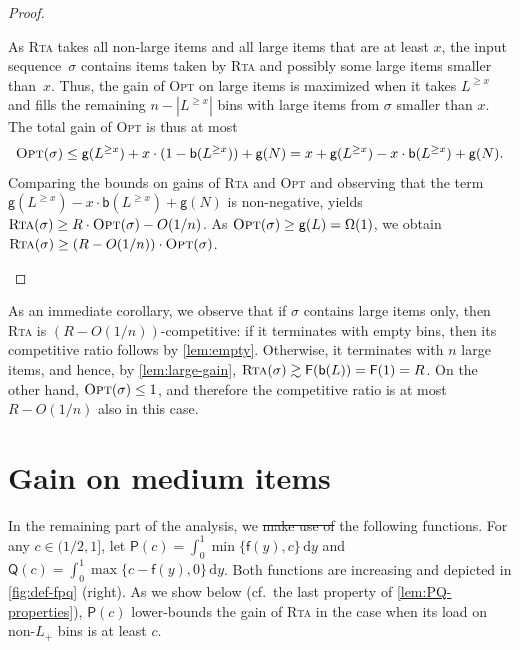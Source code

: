 \documentclass[a4paper,USenglish,cleveref]{lipics-v2019}
\newcommand{\R}{\ensuremath{R}}
\newcommand{\LG}{\ensuremath{L}\xspace}
\newcommand{\LT}{\ensuremath{L_+}\xspace}
\newcommand{\f}{\textsf{f}}
\newcommand{\fintegral}{\textsf{F}}
\newcommand{\water}{\textsf{Q}}
\newcommand{\cutintegral}{\textsf{P}}
\newcommand{\B}{\textsf{b}}
\newcommand{\gain}{\textsf{g}}
\newcommand{\dd}{\mathrm{d}}
\newcommand{\ALG}{\textsc{Rta}\xspace}
\newcommand{\OPT}{\textsc{Opt}\xspace}
\newcommand\maciek[1]{\texthl{#1}}
\begin{document}
\begin{proof}
\begin{itemize}
As \ALG takes all non-large items and all large items that are at least $x$, the
input sequence~$\sigma$ contains items taken by \ALG and possibly some large
items smaller than~$x$. Thus, the gain of \OPT on large items is maximized when
it takes $\LG^{\geq x}$ and fills the remaining $n - |L^{\geq x}|$ bins with
large items from $\sigma$ smaller than $x$. The total gain of \OPT
is thus at most 
\[
  \OPT(\sigma) \leq \gain(L^{\geq x}) + x \cdot (1-\B(\LG^{\geq x})) + \gain(N) 
  = x + \gain(L^{\geq x}) - x \cdot \B(\LG^{\geq x}) + \gain(N).
\]
Comparing the bounds on gains of \ALG and \OPT and observing that 
the term $\gain(L^{\geq x}) - x \cdot \B(\LG^{\geq x}) + \gain(N)$
is non-negative, yields $\ALG(\sigma) \geq \R \cdot \OPT(\sigma) - O(1/n)$. 
As $\OPT(\sigma) \geq \gain(\LG) = \Omega(1)$, we obtain
$\ALG(\sigma) \geq (\R - O(1/n)) \cdot \OPT(\sigma)$.
\qedhere
\end{itemize}
\end{proof}

As an immediate corollary, we observe that if $\sigma$ contains large
items only, then \ALG is $(R - O(1/n))$-competitive: if it terminates with empty
bins, then its competitive ratio follows by \cref{lem:empty}. Otherwise, it
terminates with $n$ large items, and hence, by \cref{lem:large-gain}, $\ALG(\sigma) \gtrsim
\fintegral(\B(\LG)) = \fintegral(1) = \R$. On the other hand, $\OPT(\sigma) \leq 1$, and
therefore the competitive ratio is at most $R - O(1/n)$ also in this case.




\section{Gain on medium items}
\label{sec:medium}


In the remaining part of the analysis, we \st{make use of} \maciek{use} the following functions.
For any $c \in (1/2, 1]$, let $\cutintegral(c) = \int_0^1 \min \{ \f(y), c \}\,
\dd y$ and $\water(c) = \int_0^1 \max \{ c - \f(y), 0 \}\, \dd y$. Both
functions are increasing and depicted in \cref{fig:def-fpq} (right).
As we show below (cf.~the last property of \cref{lem:PQ-properties}),
$\cutintegral(c)$ lower-bounds the gain of \ALG in the case when
its load on non-\LT bins is at least $c$.
\end{document}
